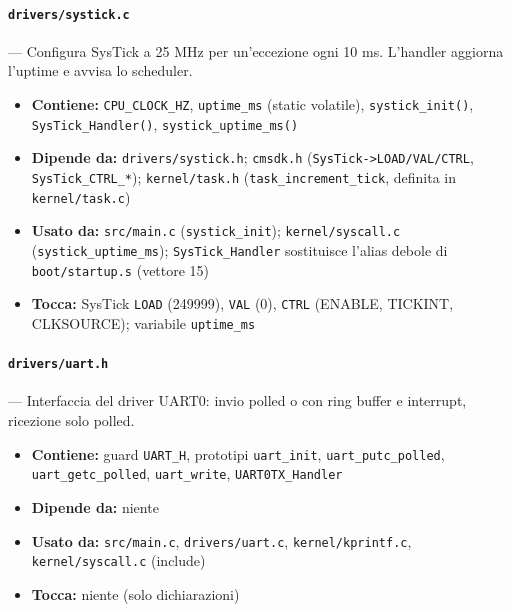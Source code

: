 \paragraph{\texttt{drivers/systick.c}} --- Configura SysTick a 25 MHz per un'eccezione ogni 10 ms. L'handler aggiorna l'uptime e avvisa lo scheduler.
\begin{itemize}
  \item \textbf{Contiene:} \texttt{CPU\_CLOCK\_HZ}, \texttt{uptime\_ms} (static volatile), \texttt{systick\_init()}, \texttt{SysTick\_Handler()}, \texttt{systick\_uptime\_ms()}
  \item \textbf{Dipende da:} \texttt{drivers/systick.h}; \texttt{cmsdk.h} (\texttt{SysTick->LOAD/VAL/CTRL}, \texttt{SysTick\_CTRL\_*}); \texttt{kernel/task.h} (\texttt{task\_increment\_tick}, definita in \texttt{kernel/task.c})
  \item \textbf{Usato da:} \texttt{src/main.c} (\texttt{systick\_init}); \texttt{kernel/syscall.c} (\texttt{systick\_uptime\_ms}); \texttt{SysTick\_Handler} sostituisce l'alias debole di \texttt{boot/startup.s} (vettore 15)
  \item \textbf{Tocca:} SysTick \texttt{LOAD} (249999), \texttt{VAL} (0), \texttt{CTRL} (ENABLE, TICKINT, CLKSOURCE); variabile \texttt{uptime\_ms}
\end{itemize}

\paragraph{\texttt{drivers/uart.h}} --- Interfaccia del driver UART0: invio polled o con ring buffer e interrupt, ricezione solo polled.
\begin{itemize}
  \item \textbf{Contiene:} guard \texttt{UART\_H}, prototipi \texttt{uart\_init}, \texttt{uart\_putc\_polled}, \texttt{uart\_getc\_polled}, \texttt{uart\_write}, \texttt{UART0TX\_Handler}
  \item \textbf{Dipende da:} niente
  \item \textbf{Usato da:} \texttt{src/main.c}, \texttt{drivers/uart.c}, \texttt{kernel/kprintf.c}, \texttt{kernel/syscall.c} (include)
  \item \textbf{Tocca:} niente (solo dichiarazioni)
\end{itemize}

